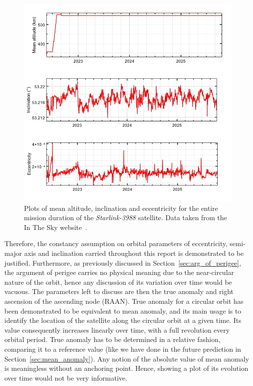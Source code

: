 \documentclass{article}
\begin{document}
\begin{figure}[h]
    \centering
    \includegraphics[width=\linewidth]{LaTeX/Figures/change_in_orbital_parameters.png}
    \caption{Plots of mean altitude, inclination and eccentricity for the entire mission duration of the \textit{Starlink-3988} satellite. Data taken from the In The Sky website~\cite{inthesky_starlink3988}.}
    \label{fig:parameters_plot_in_the_sky}
\end{figure}

Therefore, the constancy assumption on orbital parameters of eccentricity, semi-major axis and inclination carried throughout this report is demonstrated to be justified. Furthermore, as previously discussed in Section~\ref{sec:arg_of_perigee}, the argument of perigee carries no physical meaning due to the near-circular nature of the orbit, hence any discussion of its variation over time would be vacuous. The parameters left to discuss are then the true anomaly and right ascension of the ascending node (RAAN). True anomaly for a circular orbit has been demonstrated to be equivalent to mean anomaly, and its main usage is to identify the location of the satellite along the circular orbit at a given time. Its value consequently increases linearly over time, with a full revolution every orbital period. True anomaly has to be determined in a relative fashion, comparing it to a reference value (like we have done in the future prediction in Section~\ref{sec:mean_anomaly}). Any notion of the absolute value of mean anomaly is meaningless without an anchoring point. Hence, showing a plot of its evolution over time would not be very informative.
\end{document}
